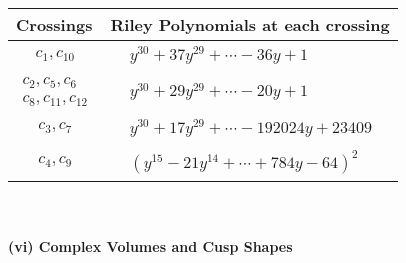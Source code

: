\documentclass[1p]{elsarticle_modified}
\theoremstyle{definition}
\begin{document}
\begin{tabular}{m{50pt}|m{274pt}}
Crossings & \hspace{64pt}Riley Polynomials at each crossing \\
\hline $$\begin{aligned}c_{1},c_{10}\end{aligned}$$&$\begin{aligned}
&y^{30}+37 y^{29}+\cdots-36 y+1
\end{aligned}$\\
\hline $$\begin{aligned}c_{2},c_{5},c_{6}\\c_{8},c_{11},c_{12}\end{aligned}$$&$\begin{aligned}
&y^{30}+29 y^{29}+\cdots-20 y+1
\end{aligned}$\\
\hline $$\begin{aligned}c_{3},c_{7}\end{aligned}$$&$\begin{aligned}
&y^{30}+17 y^{29}+\cdots-192024 y+23409
\end{aligned}$\\
\hline $$\begin{aligned}c_{4},c_{9}\end{aligned}$$&$\begin{aligned}
&(y^{15}-21 y^{14}+\cdots+784 y-64)^{2}
\end{aligned}$\\
\hline
\end{tabular}\\~\\
\newpage\flushleft \textbf{(vi) Complex Volumes and Cusp Shapes}
\end{document}
